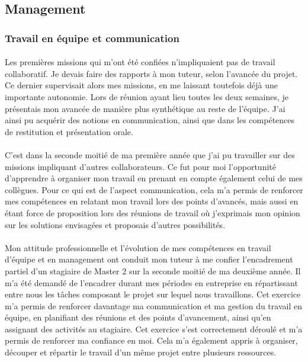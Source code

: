 \documentclass[12pt,a4paper]{report}
\begin{document}
\subsection{Management}
\subsubsection{Travail en équipe et communication}
\paragraph*{}Les premières missions qui m'ont été confiées n'impliquaient pas de travail collaboratif. Je devais faire des rapports à mon tuteur, selon l'avancée du projet. Ce dernier supervisait alors mes missions, en me laissant toutefois déjà une importante autonomie. Lors de réunion ayant lieu toutes les deux semaines, je présentais mon avancée de manière plus synthétique au reste de l'équipe. J'ai ainsi pu acquérir des notions en communication, ainsi que dans les compétences de restitution et présentation orale.
\paragraph*{}C'est dans la seconde moitié de ma première année que j'ai pu travailler sur des missions impliquant d'autres collaborateurs. Ce fut pour moi l'opportunité d'apprendre à organiser mon travail en prenant en compte également celui de mes collègues. Pour ce qui est de l'aspect communication, cela m'a permis de renforcer mes compétences en relatant mon travail lors des points d'avancés, mais aussi en étant force de proposition lors des réunions de travail où j'exprimais mon opinion sur les solutions envisagées et proposais d'autres possibilités.
\paragraph*{}Mon attitude professionnelle et l'évolution de mes compétences en travail d'équipe et en  management ont conduit mon tuteur à me confier l'encadrement partiel d'un stagiaire de Master 2 sur la seconde moitié de ma deuxième année. Il m'a été demandé de l'encadrer durant mes périodes en entreprise en répartissant entre nous les tâches composant le projet sur lequel nous travaillons. Cet exercice m'a permis de renforcer davantage ma communication et ma gestion du travail en équipe, en planifiant des réunions et des points d'avancement, ainsi qu'en assignant des activités au stagiaire. Cet exercice s'est correctement déroulé et m'a permis de renforcer ma confiance en moi. Cela m'a également appris à organiser, découper et répartir le travail d'un même projet entre plusieurs ressources.
\end{document}
